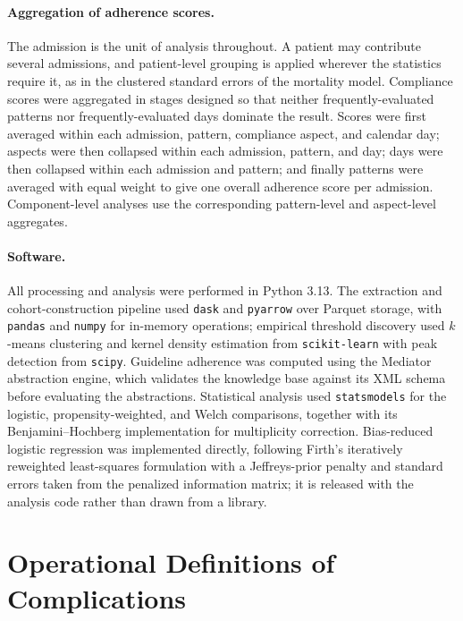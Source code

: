\documentclass[11pt,a4paper]{article}
\begin{document}
\paragraph{Aggregation of adherence scores.}
The admission is the unit of analysis throughout. A patient may contribute
several admissions, and patient-level grouping is applied wherever the
statistics require it, as in the clustered standard errors of the mortality
model. Compliance scores were aggregated in stages designed so that neither
frequently-evaluated patterns nor frequently-evaluated days dominate the
result. Scores were first averaged within each admission, pattern, compliance
aspect, and calendar day; aspects were then collapsed within each admission,
pattern, and day; days were then collapsed within each admission and pattern;
and finally patterns were averaged with equal weight to give one overall
adherence score per admission. Component-level analyses use the corresponding
pattern-level and aspect-level aggregates.

\paragraph{Software.}
All processing and analysis were performed in Python 3.13. The extraction and
cohort-construction pipeline used \texttt{dask} and \texttt{pyarrow} over
Parquet storage, with \texttt{pandas} and \texttt{numpy} for in-memory
operations; empirical threshold discovery used $k$-means clustering and
kernel density estimation from \texttt{scikit-learn} with peak detection from
\texttt{scipy}. Guideline adherence was computed using the Mediator
abstraction engine,\citep{mediator-github} which validates the knowledge
base against its XML schema before evaluating the abstractions. Statistical
analysis used \texttt{statsmodels} for the logistic, propensity-weighted, and
Welch comparisons, together with its Benjamini--Hochberg implementation for
multiplicity correction. Bias-reduced logistic regression was implemented
directly, following Firth's iteratively reweighted least-squares formulation
with a Jeffreys-prior penalty and standard errors taken from the penalized
information matrix; it is released with the analysis code rather than drawn
from a library.

\section{Operational Definitions of Complications}
\label{app:definitions}
\end{document}
